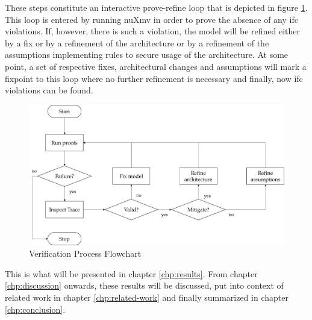 These steps constitute an interactive prove-refine loop that is depicted in figure \ref{fig:ver-process}.
This loop is entered by running nuXmv in order to prove the absence of any \gls{ifc} violations.
If, however, there is such a violation, the model will be refined either by a fix or by a refinement of the architecture or by a refinement of the assumptions implementing rules to secure usage of the architecture.
At some point, a set of respective fixes, architectural changes and assumptions will mark a fixpoint to this loop where no further refinement is necessary and finally, now \gls{ifc} violations can be found.

\begin{figure}
    \centering
    \includegraphics[width=\textwidth]{figures/verfification-process.png}
    \caption{Verification Process Flowchart}
    \label{fig:ver-process}
\end{figure}

This is what will be presented in chapter \ref{chp:results}.
From chapter \ref{chp:discussion} onwards, these results will be discussed, put into context of related work in chapter \ref{chp:related-work} and finally summarized in chapter \ref{chp:conclusion}.
